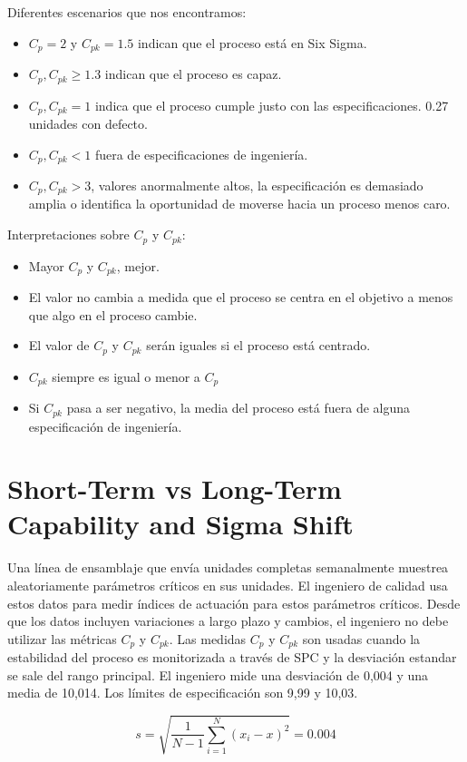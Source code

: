 \documentclass[oneside]{book}
\begin{document}
Diferentes escenarios que nos encontramos: 
\begin{itemize}
	\item $C_p = 2$ y $C_{pk} = 1.5$ indican que el proceso está en Six Sigma.
	\item $C_p, C_{pk} \geq 1.3$ indican que el proceso es capaz.
	\item $C_p, C_{pk} = 1$ indica que el proceso cumple justo con las especificaciones. 0.27 unidades con defecto.
	\item $C_p, C_{pk} < 1$ fuera de especificaciones de ingeniería.
	\item $C_p, C_{pk} > 3$, valores anormalmente altos, la especificación es demasiado amplia o identifica la oportunidad de moverse hacia un proceso menos caro.
\end{itemize}

Interpretaciones sobre $C_p$ y $C_{pk}$:
\begin{itemize}
	\item Mayor $C_p$ y $C_{pk}$, mejor.
	\item El valor no cambia a medida que el proceso se centra en el objetivo a menos que algo en el proceso cambie.
	\item El valor de $C_p$ y $C_{pk}$ serán iguales si el proceso está centrado.
	\item $C_{pk}$ siempre es igual o menor a $C_p$
	\item Si $C_{pk}$ pasa a ser negativo, la media del proceso está fuera de alguna especificación de ingeniería.
\end{itemize}

\section{Short-Term vs Long-Term Capability and Sigma Shift}

Una línea de ensamblaje que envía unidades completas semanalmente muestrea aleatoriamente parámetros críticos en sus unidades. El ingeniero de calidad usa estos datos para medir índices de actuación para estos parámetros críticos. Desde que los datos incluyen variaciones a largo plazo y cambios, el ingeniero no debe utilizar las métricas $C_p$ y $C_{pk}$. Las medidas $C_p$ y $C_{pk}$ son usadas cuando la estabilidad del proceso es monitorizada a través de SPC y la desviación estandar se sale del rango principal. El ingeniero mide una desviación de 0,004 y una media de 10,014. Los límites de especificación son 9,99 y 10,03.

\begin{equation}
s = \sqrt{\frac{1}{N-1}\sum_{i=1}^{N}(x_i-x)^2} = 0.004
\end{equation}
\end{document}
